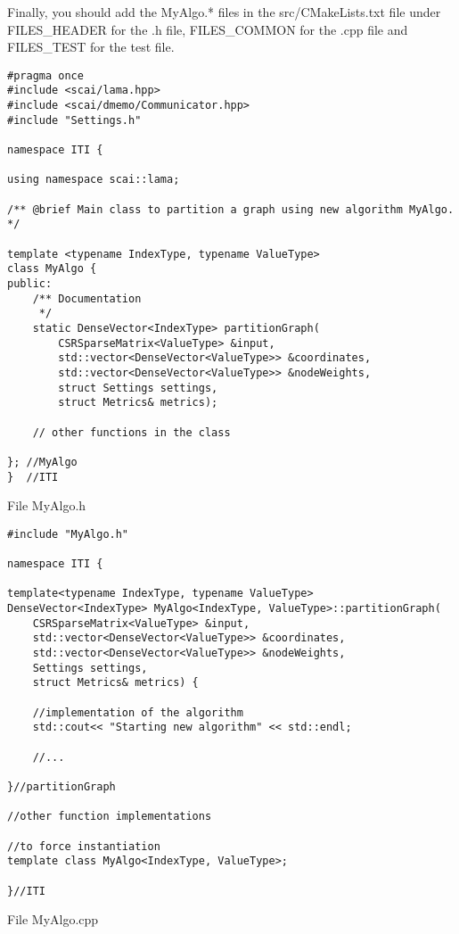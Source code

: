 \documentclass[a4paper,10pt]{article}
\begin{document}
Finally, you should add the MyAlgo.* files in the src/CMakeLists.txt file under FILES\_HEADER for the
.h file, FILES\_COMMON for the .cpp file and FILES\_TEST for the test file.


\begin{algorithm}
\begin{verbatim}
#pragma once
#include <scai/lama.hpp>
#include <scai/dmemo/Communicator.hpp>
#include "Settings.h"

namespace ITI {
	
using namespace scai::lama;

/** @brief Main class to partition a graph using new algorithm MyAlgo.
*/

template <typename IndexType, typename ValueType>
class MyAlgo {
public:
    /** Documentation
     */
    static DenseVector<IndexType> partitionGraph(
        CSRSparseMatrix<ValueType> &input,
        std::vector<DenseVector<ValueType>> &coordinates,
        std::vector<DenseVector<ValueType>> &nodeWeights,
        struct Settings settings,
        struct Metrics& metrics);
	
	// other functions in the class
	
}; //MyAlgo
}  //ITI
\end{verbatim}
\caption{File MyAlgo.h}
\label{MyAlgo.h}
\end{algorithm}

\begin{algorithm}
\begin{verbatim}
#include "MyAlgo.h"

namespace ITI {
	
template<typename IndexType, typename ValueType>
DenseVector<IndexType> MyAlgo<IndexType, ValueType>::partitionGraph(
    CSRSparseMatrix<ValueType> &input,
    std::vector<DenseVector<ValueType>> &coordinates,
    std::vector<DenseVector<ValueType>> &nodeWeights,
    Settings settings,
    struct Metrics& metrics) {
	
	//implementation of the algorithm
	std::cout<< "Starting new algorithm" << std::endl;
	
	//...
	
}//partitionGraph

//other function implementations

//to force instantiation
template class MyAlgo<IndexType, ValueType>;

}//ITI

\end{verbatim}
\caption{File MyAlgo.cpp}
\label{MyAlgo.cpp}
\end{algorithm}
\end{document}
